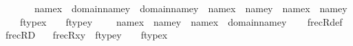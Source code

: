 \begin{isabellebody}
\ \ \ \ \ \ {\isasymand}\ {\isacharparenleft}{\kern0pt}name{}{\isacharparenleft}{\kern0pt}x{\isacharparenright}{\kern0pt}\ {\isasymin}\ domain{\isacharparenleft}{\kern0pt}name{}{\isacharparenleft}{\kern0pt}y{\isacharparenright}{\kern0pt}{\isacharparenright}{\kern0pt}\ {\isasymunion}\ domain{\isacharparenleft}{\kern0pt}name{}{\isacharparenleft}{\kern0pt}y{\isacharparenright}{\kern0pt}{\isacharparenright}{\kern0pt}\ {\isasymand}\ {\isacharparenleft}{\kern0pt}name{}{\isacharparenleft}{\kern0pt}x{\isacharparenright}{\kern0pt}\ {\isacharequal}{\kern0pt}\ name{}{\isacharparenleft}{\kern0pt}y{\isacharparenright}{\kern0pt}\ {\isasymor}\ name{}{\isacharparenleft}{\kern0pt}x{\isacharparenright}{\kern0pt}\ {\isacharequal}{\kern0pt}\ name{}{\isacharparenleft}{\kern0pt}y{\isacharparenright}{\kern0pt}{\isacharparenright}{\kern0pt}{\isacharparenright}{\kern0pt}{\isacharparenright}{\kern0pt}\isanewline
\ \ \ {\isasymor}\ {\isacharparenleft}{\kern0pt}ftype{\isacharparenleft}{\kern0pt}x{\isacharparenright}{\kern0pt}\ {\isacharequal}{\kern0pt}\ {}\ {\isasymand}\ ftype{\isacharparenleft}{\kern0pt}y{\isacharparenright}{\kern0pt}\ {\isacharequal}{\kern0pt}\ \ {}\ {\isasymand}\ name{}{\isacharparenleft}{\kern0pt}x{\isacharparenright}{\kern0pt}\ {\isacharequal}{\kern0pt}\ name{}{\isacharparenleft}{\kern0pt}y{\isacharparenright}{\kern0pt}\ {\isasymand}\ name{}{\isacharparenleft}{\kern0pt}x{\isacharparenright}{\kern0pt}\ {\isasymin}\ domain{\isacharparenleft}{\kern0pt}name{}{\isacharparenleft}{\kern0pt}y{\isacharparenright}{\kern0pt}{\isacharparenright}{\kern0pt}{\isacharparenright}{\kern0pt}{\isachardoublequoteclose}\isanewline
%
\isadelimproof
\ \ %
\endisadelimproof
%
\isatagproof
{}\isamarkupfalse%
\ frecR{\isacharunderscore}{\kern0pt}def\ \isacommand{{\isachardot}{\kern0pt}{\isachardot}{\kern0pt}}\isamarkupfalse%
%
\endisatagproof
{\isafoldproof}%
%
\isadelimproof
\isanewline
%
\endisadelimproof
\isanewline
{}\isamarkupfalse%
\ frecR{\isacharunderscore}{\kern0pt}D{}\ {\isacharcolon}{\kern0pt}\isanewline
\ \ {\isachardoublequoteopen}frecR{\isacharparenleft}{\kern0pt}x{\isacharcomma}{\kern0pt}y{\isacharparenright}{\kern0pt}\ {\isasymLongrightarrow}\ ftype{\isacharparenleft}{\kern0pt}y{\isacharparenright}{\kern0pt}\ {\isacharequal}{\kern0pt}\ {}\ {\isasymLongrightarrow}\ ftype{\isacharparenleft}{\kern0pt}x{\isacharparenright}{\kern0pt}\ {\isacharequal}{\kern0pt}\ {}\ {\isasymand}\ \isanewline

\end{isabellebody}
